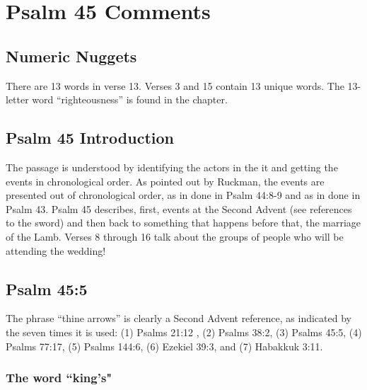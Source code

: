 \section{Psalm 45 Comments}

\subsection{Numeric Nuggets}
There are 13 words in verse 13. Verses 3 and 15 contain 13 unique words. The 13-letter word ``righteousness'' is found in the chapter.

\subsection{Psalm 45 Introduction}
The passage is  understood by identifying the actors in the it and getting the events in chronological order. As pointed out by Ruckman, the events are presented out of chronological order, as in done in Psalm 44:8-9 and as in done in Psalm 43.\cite{Ruckman1992Psalms} Psalm 45 describes, first, events at the Second Advent (see references to the sword) and then back to something that happens before that, the marriage of the Lamb. Verses 8 through 16 talk about the groups of people who will be attending the wedding!

\subsection{Psalm 45:5}
The phrase ``thine arrows'' is clearly a Second Advent reference, as indicated by the seven times it is used: (1) Psalms 21:12 , (2) Psalms 38:2, (3) Psalms 45:5, (4) Psalms 77:17, (5) Psalms 144:6, (6) Ezekiel 39:3, and (7) Habakkuk 3:11.

\subsubsection{The word ``king's"}


